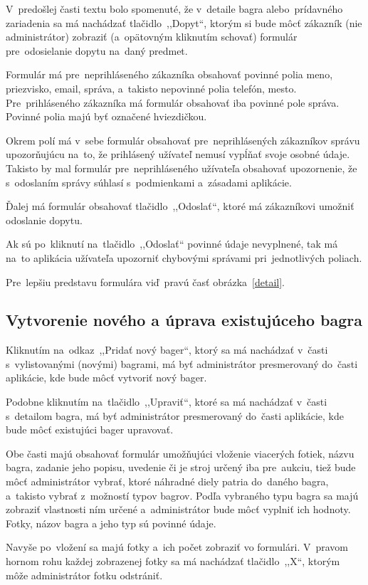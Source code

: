 V~predošlej časti textu bolo spomenuté, že v~detaile bagra alebo~prídavného zariadenia sa má nachádzať tlačidlo~,,Dopyt``, ktorým si bude môcť zákazník (nie administrátor) zobraziť (a~opätovným kliknutím schovať) formulár pre~odosielanie dopytu na~daný predmet.

Formulár má pre~neprihláseného zákazníka obsahovať povinné polia meno, priezvisko, email, správa, a~takisto nepovinné polia telefón, mesto. Pre~prihláseného zákazníka má formulár obsahovať iba povinné pole správa. Povinné polia majú byť označené hviezdičkou.

Okrem polí má v~sebe formulár obsahovať pre~neprihlásených zákazníkov správu upozorňujúcu na~to, že prihlásený užívateľ nemusí vypĺňať svoje osobné údaje. Takisto by mal formulár pre~neprihláseného užívateľa obsahovať upozornenie, že s~odoslaním správy súhlasí s~podmienkami a~zásadami aplikácie.

Ďalej má formulár obsahovať tlačidlo~,,Odoslať``, ktoré má zákazníkovi umožniť odoslanie dopytu.

Ak sú po~kliknutí na~tlačidlo~,,Odoslať`` povinné údaje nevyplnené, tak má na~to aplikácia užívateľa upozorniť chybovými správami pri~jednotlivých poliach.

Pre~lepšiu predstavu formulára viď~pravú časť obrázka~\ref{detail}.

\subsection{Vytvorenie nového a úprava existujúceho bagra}

Kliknutím na~odkaz~,,Pridať nový bager``, ktorý sa má nachádzať v~časti s~vylistovanými (novými) bagrami, má byť administrátor presmerovaný do~časti aplikácie, kde bude môcť vytvoriť nový bager.

Podobne kliknutím na~tlačidlo~,,Upraviť``, ktoré sa má nachádzať v~časti s~detailom bagra, má byť administrátor presmerovaný do~časti aplikácie, kde bude môcť existujúci bager upravovať.

Obe časti majú obsahovať formulár umožňujúci vloženie viacerých fotiek, názvu bagra, zadanie jeho popisu, uvedenie či je stroj určený iba pre~aukciu, tiež bude môcť administrátor vybrať, ktoré náhradné diely patria do~daného bagra, a~takisto vybrať z~možností typov bagrov. Podľa vybraného typu bagra sa majú zobraziť vlastnosti ním určené a~administrátor bude môcť vyplniť ich hodnoty. Fotky, názov bagra a jeho typ sú povinné údaje.

Navyše po~vložení sa majú fotky a~ich počet zobraziť vo formulári. V~pravom hornom rohu každej zobrazenej fotky sa má nachádzať tlačidlo~,,X``, ktorým môže administrátor fotku odstrániť.

